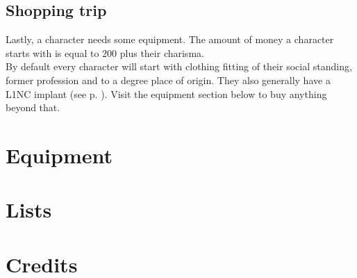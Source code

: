 \documentclass[12pt,a4paper,openany,usenames,dvipsnames]{book}
\begin{document}
	\section{Shopping trip}
	Lastly, a character needs some equipment. The amount of money a character starts with is equal to 200 plus their charisma. \\
	By default every character will start with clothing fitting of their social standing, former profession and to a degree place of origin.
	They also generally have a L1NC implant (see p. \pageref{implant:l1nc}).
	Visit the equipment section below to buy anything beyond that.

	\chapter{Equipment}
	
	
	
	
	
	

	
	

	\chapter{Lists}
	
	
	

	
	
	
	

	

	
	
	

	\chapter{Credits}
	
\end{document}
